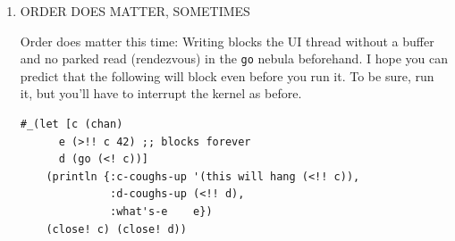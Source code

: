 \documentclass[10pt,oneside,x11names]{article}
\begin{document}
\begin{enumerate}
\begin{verbatim}
(let [c (chan) ;; NO BUFFER!
      d (go (<! c)) ;; park a pseudothread to read c
      e (>!! c 42)  ;; blocking write unparks c's pseudothread
      f '(hangs (>!! c 43))] ;; is `c` closed?
    (println {:c-coughs-up '(hangs (<!! c)),
              :d-coughs-up (<!! d),
              :what's-e    e,
              :what's-f    f})
    (close! c) (close! d))
\end{verbatim}

\begin{verbatim}
{:c-coughs-up (hangs (<!! c)), :d-coughs-up 42, :what's-e true, :what's-f (hangs (>!! c 43))}
\end{verbatim}


StackOverflow reveals a way to find out whether a channel is closed by
peeking under the covers (\url{https://stackoverflow.com/questions/24912971}):

\begin{verbatim}
(let [c (chan) ;; NO BUFFER!
      d (go (<! c)) ;; park a pseudothread to read c
      e (>!! c 42)  ;; blocking write unparks c's pseudothread
      f (clojure.core.async.impl.protocols/closed? c)]
    (println {:c-coughs-up '(hangs (<!! c)),
              :d-coughs-up (<!! d),
              :c-is-open-at-e?  e,
              :c-is-open-at-f?  f})
    (close! c) (close! d))
\end{verbatim}

\begin{verbatim}
{:c-coughs-up (hangs (<!! c)), :d-coughs-up 42, :c-is-open-at-e? true, :c-is-open-at-f? false}
\end{verbatim}

\item ORDER DOES MATTER, SOMETIMES
\label{sec:org858df44}

Order does matter this time: Writing blocks the UI thread without a
buffer and no parked read (rendezvous) in the \texttt{go} nebula beforehand. I
hope you can predict that the following will block even before you run
it. To be sure, run it, but you'll have to interrupt the kernel as
before.

\begin{verbatim}
#_(let [c (chan)
      e (>!! c 42) ;; blocks forever
      d (go (<! c))]
    (println {:c-coughs-up '(this will hang (<!! c)),
              :d-coughs-up (<!! d),
              :what's-e    e})
    (close! c) (close! d))
\end{verbatim}
\end{enumerate}
\end{document}
